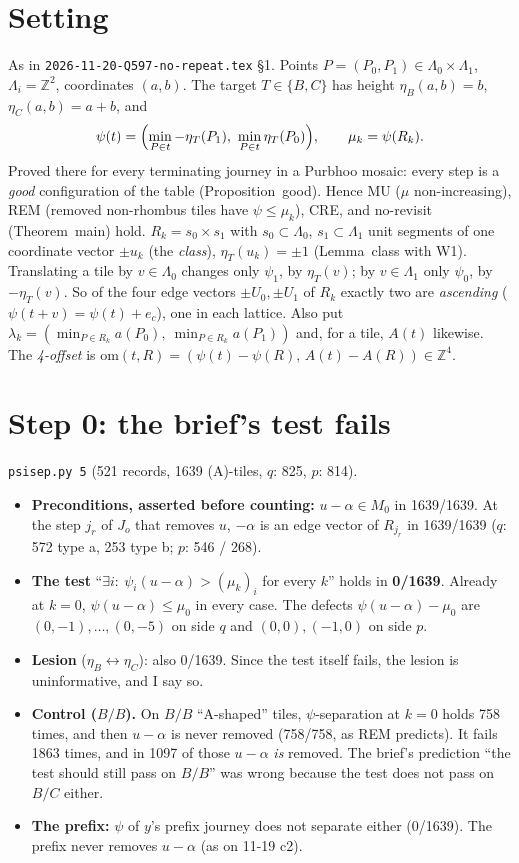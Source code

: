 \documentclass[11pt]{article}
\theoremstyle{definition}\newtheorem{definition}[theorem]{Definition}\newtheorem{remark}[theorem]{Remark}
\newcommand{\Z}{\mathbb Z}
\begin{document}
\section{Setting}\label{sec:set}
As in \texttt{2026-11-20-Q597-no-repeat.tex} \S1. Points $P=(P_0,P_1)\in\Lambda_0\times\Lambda_1$, $\Lambda_i=\Z^2$, coordinates $(a,b)$. The target $T\in\{B,C\}$ has height $\eta_B(a,b)=b$, $\eta_C(a,b)=a+b$, and
\[\psi(t)=\Bigl(\min_{P\in t}-\eta_T(P_1),\ \min_{P\in t}\eta_T(P_0)\Bigr),\qquad \mu_k=\psi(R_k).\]
Proved there for every terminating journey in a Purbhoo mosaic: every step is a \emph{good} configuration of the table (Proposition~good). Hence MU ($\mu$ non-increasing), REM (removed non-rhombus tiles have $\psi\le\mu_k$), CRE, and no-revisit (Theorem~main) hold.
$R_k=s_0\times s_1$ with $s_0\subset\Lambda_0$, $s_1\subset\Lambda_1$ unit segments of one coordinate vector $\pm u_k$ (the \emph{class}), $\eta_T(u_k)=\pm1$ (Lemma~class with W1).
Translating a tile by $v\in\Lambda_0$ changes only $\psi_1$, by $\eta_T(v)$; by $v\in\Lambda_1$ only $\psi_0$, by $-\eta_T(v)$. So of the four edge vectors $\pm U_0,\pm U_1$ of $R_k$ exactly two are \emph{ascending} ($\psi(t+v)=\psi(t)+e_c$), one in each lattice.
Also put $\lambda_k=(\min_{P\in R_k}a(P_0),\ \min_{P\in R_k}a(P_1))$ and, for a tile, $A(t)$ likewise. The \emph{4-offset} is $\mathrm{om}(t,R)=(\psi(t)-\psi(R),\,A(t)-A(R))\in\Z^4$.

\section{Step 0: the brief's test fails}\label{sec:step0}
\texttt{psisep.py 5} (521 records, 1639 (A)-tiles, $q$: 825, $p$: 814).
\begin{itemize}
\item \textbf{Preconditions, asserted before counting:} $u-\alpha\in M_0$ in 1639/1639. At the step $j_r$ of $J_o$ that removes $u$, $-\alpha$ is an edge vector of $R_{j_r}$ in 1639/1639 ($q$: 572 type a, 253 type b; $p$: 546 / 268).
\item \textbf{The test} ``$\exists i:\ \psi_i(u-\alpha)>(\mu_k)_i$ for every $k$'' holds in \textbf{0/1639}. Already at $k=0$, $\psi(u-\alpha)\le\mu_0$ in every case. The defects $\psi(u-\alpha)-\mu_0$ are $(0,-1),\dots,(0,-5)$ on side $q$ and $(0,0),(-1,0)$ on side $p$.
\item \textbf{Lesion} ($\eta_B\leftrightarrow\eta_C$): also 0/1639. Since the test itself fails, the lesion is uninformative, and I say so.
\item \textbf{Control ($B/B$).} On $B/B$ ``A-shaped'' tiles, $\psi$-separation at $k=0$ holds 758 times, and then $u-\alpha$ is never removed (758/758, as REM predicts). It fails 1863 times, and in 1097 of those $u-\alpha$ \emph{is} removed. The brief's prediction ``the test should still pass on $B/B$'' was wrong because the test does not pass on $B/C$ either.
\item \textbf{The prefix:} $\psi$ of $y$'s prefix journey does not separate either (0/1639). The prefix never removes $u-\alpha$ (as on 11-19 c2).
\end{itemize}
\end{document}
